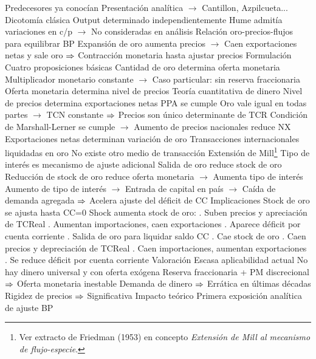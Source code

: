 \documentclass{nuevotema}
\begin{document}
\begin{esquemal}
				\4[] Predecesores ya conocían
				\4[] Presentación analítica
				\4[] $\to$ Cantillon, Azpilcueta...
				\4 Dicotomía clásica
				\4[] Output determinado independientemente
				\4[] Hume admitía variaciones en c/p
				\4[] $\to$ No consideradas en análisis
				\4 Relación oro-precios-flujos para equilibrar BP
				\4[] Expansión de oro aumenta precios
				\4[] $\to$ Caen exportaciones netas y sale oro
				\4[] $\Rightarrow$ Contracción monetaria hasta ajustar precios
			\3 Formulación
				\4 Cuatro proposiciones básicas
				\4[I] Cantidad de oro determina oferta monetaria
				\4[] Multiplicador monetario constante
				\4[] $\to$ Caso particular: sin reserva fraccionaria
				\4[II] Oferta monetaria determina nivel de precios
				\4[] Teoría cuantitativa de dinero
				\4[III] Nivel de precios determina exportaciones netas
				\4[] PPA se cumple
				\4[] Oro vale igual en todas partes
				\4[] $\to$ TCN constante
				\4[] $\Rightarrow$ Precios son único determinante de TCR
				\4[] Condición de Marshall-Lerner se cumple
				\4[] $\to$ Aumento de precios nacionales reduce NX
				\4[IV] Exportaciones netas determinan variación de oro
				\4[] Transacciones internacionales liquidadas en oro
				\4[] No existe otro medio de transacción
				\4 Extensión de Mill\footnote{Ver extracto de Friedman (1953) en concepto \textit{Extensión de Mill al mecanismo de flujo-especie}.}
				\4[] Tipo de interés es mecanismo de ajuste adicional
				\4[] Salida de oro reduce stock de oro
				\4[] Reducción de stock de oro reduce oferta monetaria
				\4[] $\to$ Aumenta tipo de interés
				\4[] Aumento de tipo de interés
				\4[] $\to$ Entrada de capital en país
				\4[] $\to$ Caída de demanda agregada
				\4[] $\Rightarrow$ Acelera ajuste del déficit de CC
			\3 Implicaciones
				\4 Stock de oro se ajusta hasta CC=0
				\4[] Shock aumenta stock de oro:
				. Suben precios y apreciación de TCReal
				. Aumentan importaciones, caen exportaciones
				. Aparece déficit por cuenta corriente
				. Salida de oro para liquidar saldo CC
				. Cae stock de oro
				. Caen precios y depreciación de TCReal
				. Caen importaciones, aumentan exportaciones
				. Se reduce déficit por cuenta corriente
			\3 Valoración
				\4 Escasa aplicabilidad actual
				\4[] No hay dinero universal y con oferta exógena
				\4[] Reserva fraccionaria + PM discrecional
				\4[] $\Rightarrow$ Oferta monetaria inestable
				\4[] Demanda de dinero
				\4[] $\Rightarrow$ Errática en últimas décadas
				\4[] Rigidez de precios
				\4[] $\Rightarrow$ Significativa
				\4 Impacto teórico
				\4[] Primera exposición analítica de ajuste BP

\end{esquemal}
\end{document}
